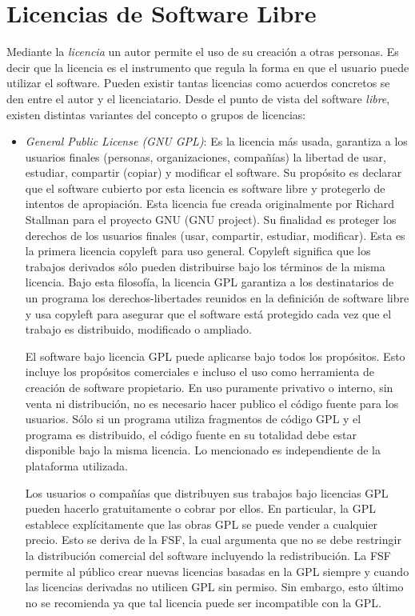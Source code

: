 \section{Licencias de Software Libre}

Mediante la \textit{licencia} un autor permite el uso de su creación a
otras personas. Es decir que la licencia es el instrumento que regula
la forma en que el usuario puede utilizar el software. Pueden existir
tantas licencias como acuerdos concretos se den entre el autor y el
licenciatario. Desde el punto de vista del software \textit{libre},
existen distintas variantes del concepto o grupos de licencias:

\begin {itemize}
\item \textit{General Public License (GNU GPL)}: Es la licencia más
  usada, garantiza a los usuarios finales (personas, organizaciones,
  compañías) la libertad de usar, estudiar, compartir (copiar) y
  modificar el software. Su propósito es declarar que el software
  cubierto por esta licencia es software libre y protegerlo de
  intentos de apropiación. Esta licencia fue creada originalmente por Richard
  Stallman para el proyecto GNU (GNU project). Su finalidad es proteger los derechos de
  los usuarios finales (usar, compartir, estudiar, modificar). Esta es
  la primera licencia copyleft para uso general. Copyleft significa
  que los trabajos derivados sólo pueden distribuirse bajo los
  términos de la misma licencia. Bajo esta filosofía, la licencia GPL
  garantiza a los destinatarios de un programa los derechos-libertades
  reunidos en la definición de software libre y usa copyleft para
  asegurar que el software está protegido cada vez que el trabajo es
  distribuido, modificado o ampliado.

  El software bajo licencia GPL puede aplicarse bajo todos los
  propósitos. Esto incluye los propósitos comerciales e incluso el uso
  como herramienta de creación de software propietario. En uso
  puramente privativo o interno, sin venta ni distribución, no es
  necesario hacer publico el código fuente para los usuarios. Sólo si
  un programa utiliza fragmentos de código GPL y el programa es
  distribuido, el código fuente en su totalidad debe estar disponible
  bajo la misma licencia. Lo mencionado es independiente de la
  plataforma utilizada. 

  Los usuarios o compañías que distribuyen sus trabajos bajo licencias
  GPL pueden hacerlo gratuitamente o cobrar por ellos. En particular,
  la GPL establece explícitamente que las obras GPL se puede vender a
  cualquier precio. Esto se deriva de la FSF, la cual argumenta que no
  se debe restringir la distribución comercial del software incluyendo
  la redistribución. La FSF permite al público crear nuevas licencias
  basadas en la GPL siempre y cuando las licencias derivadas no
  utilicen GPL sin permiso. Sin embargo, esto último no se recomienda
  ya que tal licencia puede ser incompatible con la GPL.


\end{itemize}
